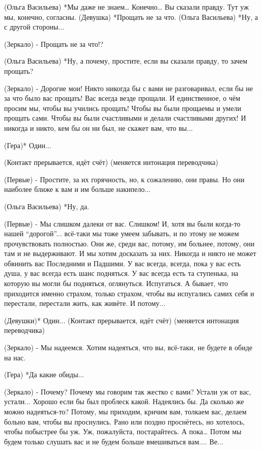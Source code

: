 (Ольга Васильева) *Мы даже не знаем… Конечно… Вы сказали правду. Тут уж мы, конечно, согласны.
(Девушка) *Прощать не за что.
(Ольга Васильева) *Ну, а с другой стороны...

(Зеркало) - Прощать не за что!? 

(Ольга Васильева) *Ну, а почему, простите, если вы сказали правду, то зачем прощать?

(Зеркало)  - Дорогие мои! Никто никогда бы с вами не разговаривал, если бы не за что было вас прощать! Вас всегда везде прощали. И единственное, о чём просим мы, чтобы вы учились прощать! Чтобы вы были прощаемы и умели прощать сами. Чтобы вы были счастливыми и делали счастливыми других! И никогда и никто, кем бы он ни был, не скажет вам, что вы...

(Гера)* Один...


(Контакт прерывается, идёт счёт)
(меняется интонация переводчика)

(Первые) - Простите, за их горячность, но, к сожалению, они правы. Но они наиболее ближе к вам и им больше накипело...

(Ольга Васильева) *Ну, да.

(Первые) - Мы слишком далеки от вас. Слишком! И, хотя вы были когда-то нашей “дорогой”... всё-таки мы тоже умеем забывать, и по этому не можем прочувствовать полностью. Они же, среди вас, потому, им больнее, потому, они там и не выдерживают. И мы хотим досказать за них. Никогда и никто не может обвинить вас Последними и Падшими. У вас всегда, всегда, пока у вас есть душа, у вас всегда есть шанс подняться. У вас всегда есть та ступенька, на которую вы могли бы подняться, оглянуться. Испугаться. А бывает, что приходится именно страхом, только страхом, чтобы вы испугались самих себя и перестали, перестали жить, как живёте. И потому...

(Девушки)* Один...
(Контакт прерывается, идёт счёт)
(меняется интонация переводчика)

(Зеркало) - Мы надеемся. Хотим надеяться, что вы, всё-таки, не будете в обиде на нас. 

(Гера) *Да какие обиды...

(Зеркало) - Почему? Почему мы говорим так жестко с вами? Устали уж от вас, устали... Хорошо если бы был проблеск какой. Надеялись бы. Да сколько же можно надеяться-то? Потому, мы приходим, кричим вам, толкаем вас, делаем больно вам, чтобы вы проснулись. Рано или поздно проснётесь, но хотелось, чтобы побыстрее бы уж. Уж, пожалуйста, постарайтесь. А пока… Потом мы будем только слушать вас и не будем больше вмешиваться вам.... Ве...

